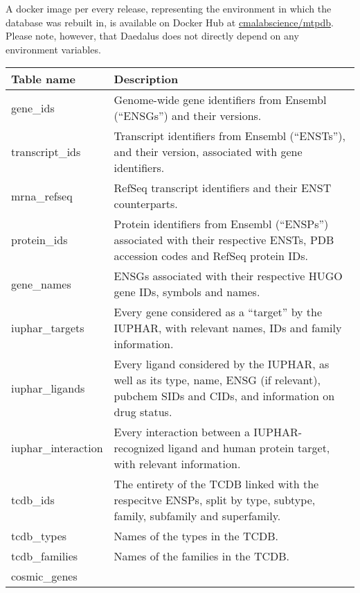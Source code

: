 A docker image per every release, representing the environment in which the database was rebuilt in, is available on Docker Hub at \href{https://hub.docker.com/r/cmalabscience/mtpdb}{cmalabscience/mtpdb}.
Please note, however, that Daedalus does not directly depend on any environment variables.

\begin{table}
\begin{tabularx}{\textwidth}{|l|X|}
        \hline
    \textbf{Table name}
        & \textbf{Description} \\
        \hline
        \hline
    gene\_ids
        & Genome-wide gene identifiers from Ensembl (``ENSGs'') and their
        versions. \\
        \hline
    transcript\_ids
        & Transcript identifiers from Ensembl (``ENSTs''), and their version,
        associated with gene identifiers. \\
        \hline
    mrna\_refseq
        & RefSeq transcript identifiers and their ENST counterparts. \\
        \hline
    protein\_ids
        & Protein identifiers from Ensembl (``ENSPs'') associated with their
        respective ENSTs, PDB accession codes and RefSeq protein IDs. \\
        \hline
    gene\_names
        & ENSGs associated with their respective HUGO gene IDs, symbols and
        names. \\
        \hline
    iuphar\_targets
        & Every gene considered as a ``target'' by the IUPHAR, with relevant
        names, IDs and family information. \\
        \hline
    iuphar\_ligands
        & Every ligand considered by the IUPHAR, as well as its type, name, ENSG
        (if relevant), pubchem SIDs and CIDs, and information on drug status. \\
        \hline
    iuphar\_interaction
        & Every interaction between a IUPHAR-recognized ligand and human protein
        target, with relevant information. \\
        \hline
    tcdb\_ids
        & The entirety of the TCDB linked with the respecitve ENSPs, split by
        type, subtype, family, subfamily and superfamily. \\
        \hline
    tcdb\_types
        & Names of the types in the TCDB. \\
        \hline
    tcdb\_families
        & Names of the families in the TCDB. \\
        \hline
    cosmic\_genes

\end{tabularx}
\end{table}

